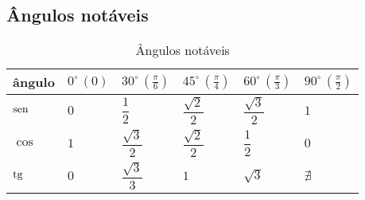 \subsection{Ângulos notáveis}
	\begin{table}[H]
		\centering
		\begin{tabular}{|l|l|l|l|l|l|}
			\hline
			ângulo & $0^\circ\, (0)$ & $30^\circ\, \left(\frac{\pi}{6}\right)$ & $45^\circ\, \left(\frac{\pi}{4}\right)$ & $60^\circ\, \left(\frac{\pi}{3}\right)$ & $90^\circ\, \left(\frac{\pi}{2}\right)$ \\ \hline
			$\operatorname{sen}$ & $0$             & $\dfrac{1}{2}$                          & $\dfrac{\sqrt{2}}{2}$                   & $\dfrac{\sqrt{3}}{2}$                   & $1$                                     \\ \hline
			$\cos$ & $1$             & $\dfrac{\sqrt{3}}{2}$                   & $\dfrac{\sqrt{2}}{2}$                   & $\dfrac{1}{2}$                          & $0$                                     \\ \hline
			$\operatorname{tg}$  & $0$             & $\dfrac{\sqrt{3}}{3}$                   & $1$                                     & $\sqrt{3}$                              & $\nexists$                                \\ \hline
		\end{tabular}
		\caption{Ângulos notáveis}
		\label{angulos_notaveis}
	\end{table}